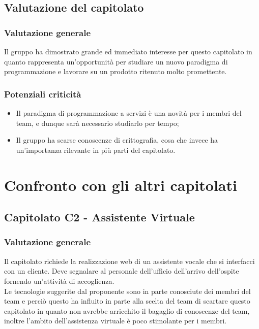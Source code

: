 \documentclass[12pt,a4paper,titlepage]{article}
\begin{document}
	\subsection{Valutazione del capitolato}
	\subsubsection{Valutazione generale }
	Il gruppo ha dimostrato grande ed immediato interesse per questo capitolato in quanto rappresenta un'opportunità per studiare un nuovo paradigma di programmazione e lavorare su un prodotto ritenuto molto promettente. 
	\subsubsection{Potenziali criticità}
	\begin{itemize}
		\item Il paradigma di programmazione a servizi è una novità per i membri del team, e dunque sarà necessario studiarlo per tempo;
		\item Il gruppo ha scarse conoscenze di crittografia, cosa che invece ha un'importanza rilevante in più parti del capitolato.
	\end{itemize}
	
	\newpage
	
	\section{Confronto con gli altri capitolati}
	
	\subsection{Capitolato C2 - Assistente Virtuale}
	\subsubsection{Valutazione generale}
	Il capitolato richiede la realizzazione web di un assistente vocale che si interfacci con un cliente. Deve segnalare al personale dell'ufficio dell'arrivo dell'ospite fornendo un'attività di accoglienza.\\
	Le tecnologie suggerite dal proponente sono in parte conosciute dei membri del team e perciò questo ha influito in parte alla scelta del team di scartare questo capitolato in quanto non avrebbe arricchito il bagaglio di conoscenze del team, inoltre l'ambito dell'assistenza virtuale è poco stimolante per i membri.
\end{document}
